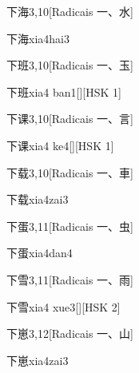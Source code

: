 \begin{entry}{下海}{3,10}[Radicais ⼀、⽔]
  \begin{phonetics}{下海}{xia4hai3}
  \end{phonetics}
\end{entry}

\begin{entry}{下班}{3,10}[Radicais ⼀、⽟]
  \begin{phonetics}{下班}{xia4 ban1}[][HSK 1]
  \end{phonetics}
\end{entry}

\begin{entry}{下课}{3,10}[Radicais ⼀、⾔]
  \begin{phonetics}{下课}{xia4 ke4}[][HSK 1]
  \end{phonetics}
\end{entry}

\begin{entry}{下载}{3,10}[Radicais ⼀、⾞]
  \begin{phonetics}{下载}{xia4zai3}
  \end{phonetics}
\end{entry}

\begin{entry}{下蛋}{3,11}[Radicais ⼀、⾍]
  \begin{phonetics}{下蛋}{xia4dan4}
  \end{phonetics}
\end{entry}

\begin{entry}{下雪}{3,11}[Radicais ⼀、⾬]
  \begin{phonetics}{下雪}{xia4 xue3}[][HSK 2]
  \end{phonetics}
\end{entry}

\begin{entry}{下崽}{3,12}[Radicais ⼀、⼭]
  \begin{phonetics}{下崽}{xia4zai3}
  \end{phonetics}
\end{entry}

